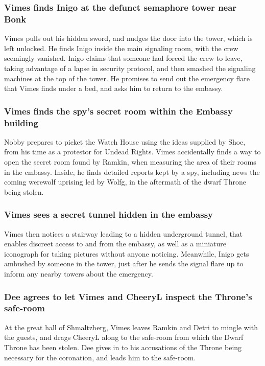 \subsubsection{\Gls{Vimes} finds \Gls{Inigo} at the defunct semaphore tower near Bonk}
\Gls{Vimes} pulls out his hidden sword, and nudges the door into the tower, which is left unlocked.
He finds \Gls{Inigo} inside the main signaling room, with the crew seemingly vanished. \Gls{Inigo}
claims that someone had forced the crew to leave, taking advantage of a lapse in security protocol,
and then smashed the signaling machines at the top of the tower. He promises to send out the
emergency flare that \Gls{Vimes} finds under a bed, and asks him to return to the embassy.

\subsubsection{\Gls{Vimes} finds the spy's secret room within the Embassy building}
\Gls{Nobby} prepares to picket the Watch House using the ideas supplied by \Gls{Shoe}, from his
time as a protestor for Undead Rights. \Gls{Vimes} accidentally finds a way to open the secret room
found by \Gls{Ramkin}, when measuring the area of their rooms in the embassy. Inside, he finds
detailed reports kept by a spy, including news the coming werewolf uprising led by \Gls{Wolfg}, in
the aftermath of the dwarf Throne being stolen.

\subsubsection{\Gls{Vimes} sees a secret tunnel hidden in the embassy}
\Gls{Vimes} then notices a stairway leading to a hidden underground tunnel, that enables discreet
access to and from the embassy, as well as a miniature iconograph for taking pictures without
anyone noticing. Meanwhile, \Gls{Inigo} gets ambushed by someone in the tower, just after he sends
the signal flare up to inform any nearby towers about the emergency.

\subsubsection{\Gls{Dee} agrees to let \Gls{Vimes} and \Gls{CheeryL} inspect the Throne's safe-room}
At the great hall of Shmaltzberg, \Gls{Vimes} leaves \Gls{Ramkin} and \Gls{Detri} to mingle with
the guests, and drags \Gls{CheeryL} along to the safe-room from which the Dwarf Throne has been
stolen. \Gls{Dee} gives in to his accusations of the Throne being necessary for the coronation, and
leads him to the safe-room.


